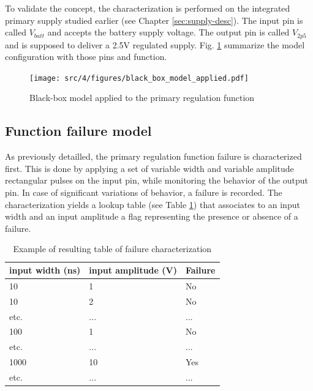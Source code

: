To validate the concept, the characterization is performed on the integrated primary supply studied earlier (see Chapter \ref{sec:supply-desc}).
The input pin is called $V_{batt}$ and accepts the battery supply voltage.
The output pin is called $V_{2p5}$ and is supposed to deliver a 2.5V regulated supply.
Fig. \ref{fig:black-box-applied} summarize the model configuration with those pins and function.

\begin{figure}[!h]
  \centering
  \texttt{[image: src/4/figures/black\_box\_model\_applied.pdf]}
  \caption{Black-box model applied to the primary regulation function}
  \label{fig:black-box-applied}
\end{figure}


\subsection{Function failure model}

As previously detailled, the primary regulation function failure is characterized first.
This is done by applying a set of variable width and variable amplitude rectangular pulses on the input pin, while monitoring the behavior of the output pin.
In case of significant variations of behavior, a failure is recorded.
The characterization yields a lookup table (see Table \ref{tab:cz-failure}) that associates to an input width and an input amplitude a flag representing the presence or absence of a failure.

\begin{table}[!h]
\centering
\begin{tabular}{@{}lll@{}}
\toprule
input width (ns) & input amplitude (V) & Failure   \\ \midrule
10               & 1                   & No        \\
10               & 2                   & No        \\
etc.             & ...                 & ...       \\
100              & 1                   & No        \\
etc.             & ...                 & ...       \\
1000             & 10                  & Yes       \\
etc.             & ...                 & ... \\ \bottomrule
\end{tabular}
\caption{Example of resulting table of failure characterization}
\label{tab:cz-failure}
\end{table}

